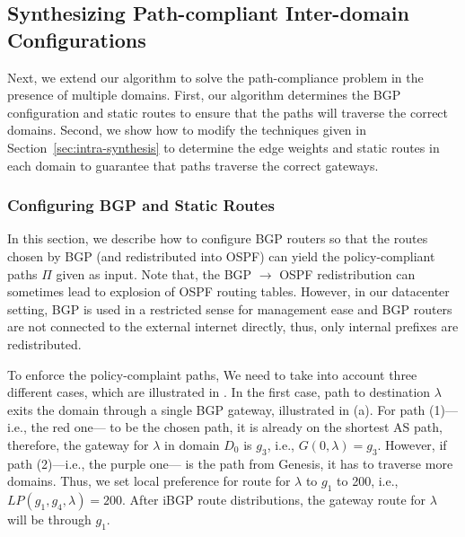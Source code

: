\subsection{Synthesizing Path-compliant Inter-domain Configurations}
\label{sec:inter-synthesis}

Next, we extend our algorithm to
solve the path-compliance problem in the presence
of multiple domains. 
First, our algorithm determines the 
BGP configuration and static routes to ensure that the 
paths will traverse the correct domains.
Second, we show how to modify the 
techniques given in Section~\ref{sec:intra-synthesis}
to determine the edge weights and static routes
 in each domain to guarantee that paths traverse
the correct gateways. 


\subsubsection{Configuring BGP and Static Routes}
In this section, we describe how to configure
BGP routers so that the routes chosen by BGP 
(and redistributed into OSPF) 
can yield the policy-compliant
paths $\Pi$ given as input. 
Note that, the BGP $\rightarrow$ OSPF redistribution
can sometimes lead to explosion of OSPF routing tables. However, 
in our datacenter setting, BGP is used in a restricted
sense for management ease and BGP routers are not connected
to the external internet directly, thus, only internal
prefixes are redistributed.


To enforce the policy-complaint paths, 
We need to take into account three different
cases, which are illustrated in .  
In the first case, path to destination $\lambda$
exits the domain through a single BGP gateway, illustrated in 
(a). For path (1)---i.e., the red one---
to be the chosen path, it is already on the shortest AS path, 
therefore, the gateway for $\lambda$ in domain $D_0$ is $g_3$, i.e.,
$G(0, \lambda) = g_3$. However, if path (2)---i.e., the purple one---
is the path from Genesis, it has to traverse more domains. Thus, 
we set local preference for route for $\lambda$ to $g_1$ to 200, i.e.,
$LP(g_1, g_4, \lambda) = 200$. After iBGP route distributions, the 
gateway route for $\lambda$ will be through $g_1$.


